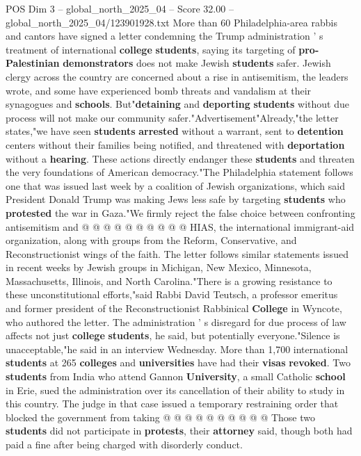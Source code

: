 \begin{textsample}{POS Dim 3 – global\_north\_2025\_04 – Score 32.00 – global\_north\_2025\_04/123901928.txt}  \label{ex:f3_pos_052}
More than 60 Philadelphia-area rabbis and cantors have signed a letter condemning the Trump administration ' s treatment of international \textbf{college} \textbf{students}, saying its targeting of \textbf{pro-Palestinian} \textbf{demonstrators} does not make Jewish \textbf{students} safer.
Jewish clergy across the country are concerned about a rise in antisemitism, the leaders wrote, and some have experienced bomb threats and vandalism at their synagogues and \textbf{schools}.
But"\textbf{detaining} and \textbf{deporting} \textbf{students} without due process will not make our community safer."Advertisement"Already,"the letter states,"we have seen \textbf{students} \textbf{arrested} without a warrant, sent to \textbf{detention} centers without their families being notified, and threatened with \textbf{deportation} without a \textbf{hearing}.
These actions directly endanger these \textbf{students} and threaten the very foundations of American democracy."The Philadelphia statement follows one that was issued last week by a coalition of Jewish organizations, which said President Donald Trump was making Jews less safe by targeting \textbf{students} who \textbf{protested} the war in Gaza."We firmly reject the false choice between confronting antisemitism and @ @ @ @ @ @ @ @ @ @ HIAS, the international immigrant-aid organization, along with groups from the Reform, Conservative, and Reconstructionist wings of the faith.
The letter follows similar statements issued in recent weeks by Jewish groups in Michigan, New Mexico, Minnesota, Massachusetts, Illinois, and North Carolina."There is a growing resistance to these unconstitutional efforts,"said Rabbi David Teutsch, a professor emeritus and former president of the Reconstructionist Rabbinical \textbf{College} in Wyncote, who authored the letter.
The administration ' s disregard for due process of law affects not just \textbf{college} \textbf{students}, he said, but potentially everyone."Silence is unacceptable,"he said in an interview Wednesday.
More than 1,700 international \textbf{students} at 265 \textbf{colleges} and \textbf{universities} have had their \textbf{visas} \textbf{revoked}.
Two \textbf{students} from India who attend Gannon \textbf{University}, a small Catholic \textbf{school} in Erie, sued the administration over its cancellation of their ability to study in this country.
The judge in that case issued a temporary restraining order that blocked the government from taking @ @ @ @ @ @ @ @ @ @ Those two \textbf{students} did not participate in \textbf{protests}, their \textbf{attorney} said, though both had paid a fine after being charged with disorderly conduct.

\end{textsample}
